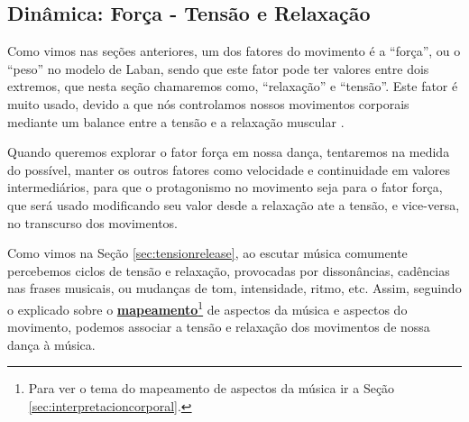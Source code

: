 \subsection{Dinâmica: Força - Tensão e Relaxação }
\label{sec:musicalidadetensionrelease}



Como vimos nas seções anteriores,
um dos fatores do movimento é a ``força'', 
ou o ``peso'' no modelo de Laban,
sendo que este fator pode ter valores entre dois extremos,
que nesta seção chamaremos como, ``relaxação'' e ``tensão''.
Este fator é muito usado, 
devido a que nós controlamos nossos movimentos corporais 
mediante um balance entre a tensão e a relaxação muscular \cite[pp. 7]{schrader2005sense}.

Quando queremos explorar o fator força em nossa dança, tentaremos na medida do possível,
manter os outros fatores como velocidade e continuidade em valores intermediários,
para que o protagonismo no movimento seja para o fator força,
que será usado modificando seu valor desde a relaxação ate a tensão, e vice-versa, no transcurso dos movimentos. 

Como vimos na Seção \ref{sec:tensionrelease}, 
ao escutar música comumente percebemos ciclos de tensão e relaxação,
provocadas por dissonâncias,  cadências nas frases musicais, ou mudanças de
tom, intensidade, ritmo, etc.
Assim, 
seguindo o explicado sobre o \hyperref[sec:interpretacioncorporal]{\textbf{mapeamento}}\footnote{Para
ver o tema do mapeamento de aspectos da música ir a Seção \ref{sec:interpretacioncorporal}.} 
de aspectos da música e aspectos do movimento,
podemos associar a tensão e relaxação dos movimentos de nossa dança à música.



